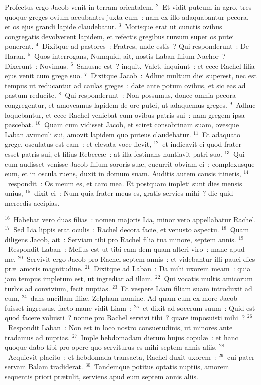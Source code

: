\lettrine[lines=3,image=true,loversize=0.05,lraise=-0.03]{P}{}rofectus ergo Jacob venit in terram orientalem.
${}^{2}$~Et vidit puteum in agro, tres quoque greges ovium accubantes juxta eum~: nam ex illo adaquabantur pecora, et os ejus grandi lapide claudebatur.
${}^{3}$~Morisque erat ut cunctis ovibus congregatis devolverent lapidem, et refectis gregibus rursum super os putei ponerent.
${}^{4}$~Dixitque ad pastores~: Fratres, unde estis~? Qui responderunt~: De Haran.
${}^{5}$~Quos interrogans, Numquid, ait, nostis Laban filium Nachor~? Dixerunt~: Novimus.
${}^{6}$~Sanusne est~? inquit. Valet, inquiunt~: et ecce Rachel filia ejus venit cum grege suo.
${}^{7}$~Dixitque Jacob~: Adhuc multum diei superest, nec est tempus ut reducantur ad caulas greges~: date ante potum ovibus, et sic eas ad pastum reducite.
${}^{8}$~Qui responderunt~: Non possumus, donec omnia pecora congregentur, et amoveamus lapidem de ore putei, ut adaquemus greges.
${}^{9}$~Adhuc loquebantur, et ecce Rachel veniebat cum ovibus patris sui~: nam gregem ipsa pascebat.
${}^{10}$~Quam cum vidisset Jacob, et sciret consobrinam suam, ovesque Laban avunculi sui, amovit lapidem quo puteus claudebatur.
${}^{11}$~Et adaquato grege, osculatus est eam~: et elevata voce flevit,
${}^{12}$~et indicavit ei quod frater esset patris sui, et filius Rebecc\ae~: at illa festinans nuntiavit patri suo.
${}^{13}$~Qui cum audisset venisse Jacob filium sororis su\ae , cucurrit obviam ei~: complexusque eum, et in oscula ruens, duxit in domum suam. Auditis autem causis itineris,
${}^{14}$~respondit~: Os meum es, et caro mea. Et postquam impleti sunt dies mensis unius,
${}^{15}$~dixit ei~: Num quia frater meus es, gratis servies mihi~? dic quid mercedis accipias.


${}^{16}$~Habebat vero duas filias~: nomen majoris Lia, minor vero appellabatur Rachel.
${}^{17}$~Sed Lia lippis erat oculis~: Rachel decora facie, et venusto aspectu.
${}^{18}$~Quam diligens Jacob, ait~: Serviam tibi pro Rachel filia tua minore, septem annis.
${}^{19}$~Respondit Laban~: Melius est ut tibi eam dem quam alteri viro~: mane apud me.
${}^{20}$~Servivit ergo Jacob pro Rachel septem annis~: et videbantur illi pauci dies pr\ae\ amoris magnitudine.
${}^{21}$~Dixitque ad Laban~: Da mihi uxorem meam~: quia jam tempus impletum est, ut ingrediar ad illam.
${}^{22}$~Qui vocatis multis amicorum turbis ad convivium, fecit nuptias.
${}^{23}$~Et vespere Liam filiam suam introduxit ad eum,
${}^{24}$~dans ancillam fili\ae , Zelpham nomine. Ad quam cum ex more Jacob fuisset ingressus, facto mane vidit Liam~:
${}^{25}$~et dixit ad socerum suum~: Quid est quod facere voluisti~? nonne pro Rachel servivi tibi~? quare imposuisti mihi~?
${}^{26}$~Respondit Laban~: Non est in loco nostro consuetudinis, ut minores ante tradamus ad nuptias.
${}^{27}$~Imple hebdomadam dierum hujus copul\ae~: et hanc quoque dabo tibi pro opere quo serviturus es mihi septem annis aliis.
${}^{28}$~Acquievit placito~: et hebdomada transacta, Rachel duxit uxorem~:
${}^{29}$~cui pater servam Balam tradiderat.
${}^{30}$~Tandemque potitus optatis nuptiis, amorem sequentis priori pr\ae tulit, serviens apud eum septem annis aliis.



